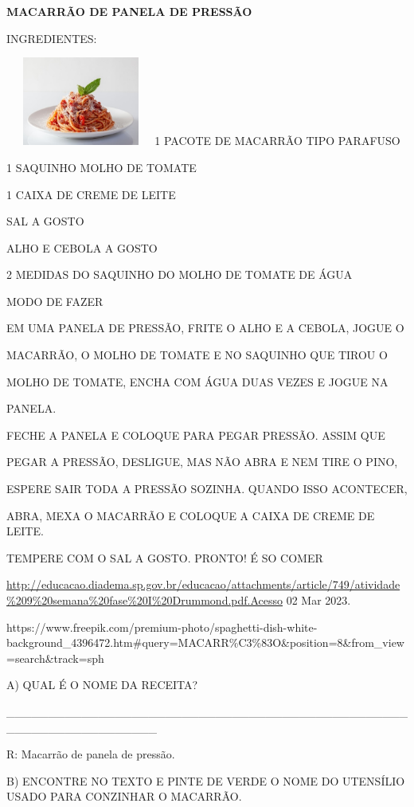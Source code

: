 {{\textbf{MACARRÃO DE PANELA DE PRESSÃO}

INGREDIENTES:

\includegraphics[width=1.94097in,height=1.14722in]{media/image84.jpeg}1
PACOTE DE MACARRÃO TIPO PARAFUSO

1 SAQUINHO MOLHO DE TOMATE

1 CAIXA DE CREME DE LEITE

SAL A GOSTO

ALHO E CEBOLA A GOSTO

2 MEDIDAS DO SAQUINHO DO MOLHO DE TOMATE DE ÁGUA

MODO DE FAZER

EM UMA PANELA DE PRESSÃO, FRITE O ALHO E A CEBOLA, JOGUE O

MACARRÃO, O MOLHO DE TOMATE E NO SAQUINHO QUE TIROU O

MOLHO DE TOMATE, ENCHA COM ÁGUA DUAS VEZES E JOGUE NA

PANELA.

FECHE A PANELA E COLOQUE PARA PEGAR PRESSÃO. ASSIM QUE

PEGAR A PRESSÃO, DESLIGUE, MAS NÃO ABRA E NEM TIRE O PINO,

ESPERE SAIR TODA A PRESSÃO SOZINHA. QUANDO ISSO ACONTECER,

ABRA, MEXA O MACARRÃO E COLOQUE A CAIXA DE CREME DE LEITE.

TEMPERE COM O SAL A GOSTO. PRONTO! É SO COMER

\url{http://educacao.diadema.sp.gov.br/educacao/attachments/article/749/atividade\%209\%20semana\%20fase\%20I\%20Drummond.pdf.Acesso}
02 Mar 2023.

https://www.freepik.com/premium-photo/spaghetti-dish-white-background\_4396472.htm\#query=MACARR\%C3\%83O\&position=8\&from\_view=search\&track=sph

A) QUAL É O NOME DA RECEITA?

\_\_\_\_\_\_\_\_\_\_\_\_\_\_\_\_\_\_\_\_\_\_\_\_\_\_\_\_\_\_\_\_\_\_\_\_\_\_\_\_\_\_\_\_\_\_\_\_\_\_\_\_\_\_\_\_\_\_\_\_\_\_\_\_\_\_

R: Macarrão de panela de pressão.

B) ENCONTRE NO TEXTO E PINTE DE VERDE O NOME DO UTENSÍLIO USADO PARA
CONZINHAR O MACARRÃO.

}}
